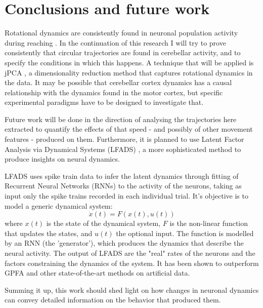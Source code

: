 \section{Conclusions and future work}

Rotational dynamics are consistently found in neuronal population activity during reaching \cite{churchland2012neural}. In the continuation of this research I will try to prove consistently that circular trajectories are found in cerebellar activity, and to specify the conditions in which this happens. A technique that will be applied is jPCA \cite{churchland2012neural}, a dimensionality reduction method that captures rotational dynamics in the data.
It may be possible that cerebellar cortex dynamics has a causal relationship with the dynamics found in the motor cortex, but specific experimental paradigms have to be designed to investigate that.

Future work will be done in the direction of analysing the trajectories here extracted to quantify the effects of that speed - and possibly of other movement features - produced on them.
Furthermore, it is planned to use Latent Factor Analysis via Dynamical Systems (LFADS) \cite{sussillo2016lfads}, a more sophisticated method to produce insights on neural dynamics.

LFADS uses spike train data to infer the latent dynamics through fitting of Recurrent Neural Networks (RNNs) to the activity of the neurons, taking as input only the spike trains recorded in each individual trial. It's objective is to model a generic dynamical system:
\begin{equation}
	\dot{x}(t) = F(x(t), u(t))
\end{equation}
where $x(t)$ is the state of the dynamical system, $F$ is the non-linear function that updates the states, and $u(t)$ the optional input. The function is modelled by an RNN (the 'generator'), which produces the dynamics that describe the neural activity.
The output of LFADS are the "real" rates of the neurons and the factors constraining the dynamics of the system. It has been shown to outperform GPFA and other state-of-the-art methods on artificial data.

Summing it up, this work should shed light on how changes in neuronal dynamics can convey detailed information on the behavior that produced them.

